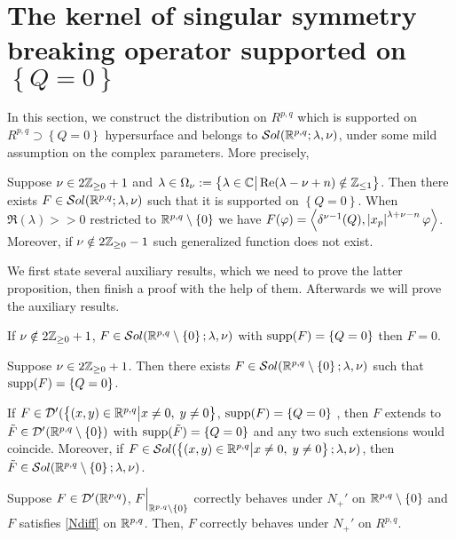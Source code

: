 \documentclass[10pt]{article} %
\newcommand{\D}{\mathcal{D}}
\theoremstyle{definition}
\theoremstyle{remark}
\begin{document}
\section{The kernel of singular symmetry breaking operator supported on $\left\{ Q=0 \right\}$}
In this section, we construct the distribution on $R^{p,q}$ which is supported on
$R^{p,q}\supset\left\{ Q=0 \right\}$ hypersurface and belongs to $\sol$,
under some mild assumption on the complex parameters. More precisely,
\begin{myprop}
	Suppose $\nu\in2\Z_{\geq0}+1$ and $\lambda\in\Omega_\nu:=
	\mysetn{\lambda\in\C}{\Re(\lambda-\nu+n)\notin\Z_{\leq1}}$.
	Then there exists $F\in\sol$ such that it is supported on $\left\{ Q=0 \right\}$.
	When $\Re(\lambda)>>0$ restricted to $\R^{p,q}\setminus\left\{ 0 \right\}$ we have $F(\varphi)=\myabra{
		\delta^{\nu-1}(Q),\myabs{x_p}^{\lambda+\nu-n}\varphi}$.
	Moreover, if $\nu\notin2\Z_{\geq0}-1$ such generalized function does not exist.
	\label{thm:sing_q}
\end{myprop}
We first state several auxiliary results, which we need to prove the latter proposition, then finish a proof with the help of them.
Afterwards we will prove the auxiliary results.
\begin{mylem}
	If $\nu\notin2\Z_{\geq0}+1$, $F\in\sol[\R^{p,q}\setminus\left\{ 0 \right\}]$ with $\supp(F)=\left\{ Q=0 \right\}$
	then $F=0$.
	\label{lem:sing_q_1}
\end{mylem}
\begin{mylem}
	Suppose $\nu\in2\Z_{\geq0}+1$. Then there exists $F\in\sol[\R^{p,q}\setminus\left\{ 0 \right\}]$
	such that $\supp(F)=\left\{ Q=0 \right\}$.
	\label{lem:sing_q_2}
\end{mylem}
\begin{mylem}
	If $F\in\D'(\mysetn{(x,y)\in\R^{p,q}}{x\neq0,\;y\neq0}$, $\supp(F)=\left\{ Q=0 \right\}$
	, then $F$ extends to $\tilde{F}\in\D'(\R^{p,q}\setminus\left\{ 0 \right\})$ with $\supp(\tilde{F})=\left\{ Q=0 \right\}$
	and any two such extensions would coincide.
	Moreover, if $F\in\sol[\Upp]$, then $\tilde{F}\in\sol[\R^{p,q}\setminus\left\{ 0 \right\}]$.
	\label{lem:sing_q_3}
\end{mylem}
\begin{mylem}
	Suppose $F\in\D'(\R^{p,q})$, $F\Big|_{\R^{p,q}\setminus\left\{ 0 \right\}}$ correctly behaves under $N_+'$ on $\R^{p,q}
	\setminus\left\{ 0 \right\}$ and $F$ satisfies \eqref{Ndiff} on $\R^{p,q}$. Then, $F$ correctly behaves under $N_{+}'$
	on $R^{p,q}$.
	\label{lem:sing_q_4}
\end{mylem}
\end{document}
